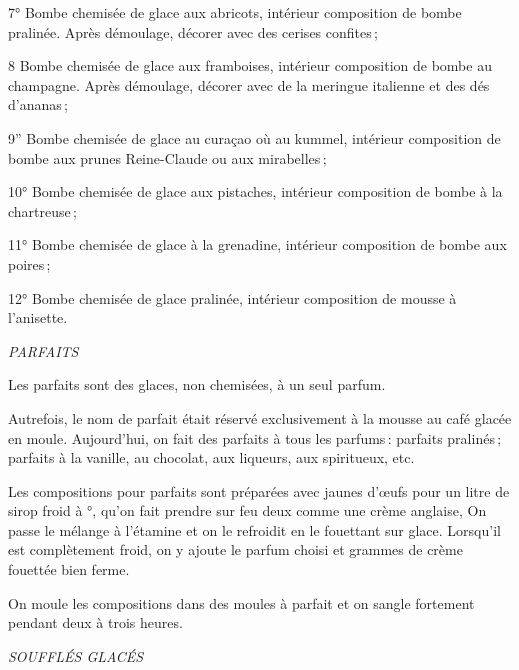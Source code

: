 7° Bombe chemisée de glace aux abricots, intérieur composition de bombe
pralinée. Après démoulage, décorer avec des cerises confites ;

8 Bombe chemisée de glace aux framboises, intérieur composition de bombe au
champagne. Après démoulage, décorer avec de la meringue italienne et des dés
d'ananas ;

9” Bombe chemisée de glace au curaçao où au kummel, intérieur composition
de bombe aux prunes Reine-Claude ou aux mirabelles ;

10° Bombe chemisée de glace aux pistaches, intérieur composition de bombe à
la chartreuse ;

11° Bombe chemisée de glace à la grenadine, intérieur composition de bombe
aux poires ;

12° Bombe chemisée de glace pralinée, intérieur composition de mousse à
l'anisette.


\bigskip

\begin{center}
\textit{PARFAITS}
\end{center}

\bigskip

Les parfaits sont des glaces, non chemisées, à un seul parfum.

Autrefois, le nom de parfait était réservé exclusivement à la mousse au café
glacée en moule. Aujourd'hui, on fait des parfaits à tous les parfums : parfaits
pralinés ; parfaits à la vanille, au chocolat, aux liqueurs, aux spiritueux, etc.

Les compositions pour parfaits sont préparées avec {\mmm} jaunes d'œufs
pour un litre de sirop froid à {\mmm}°, qu'on fait prendre sur feu deux
comme une crème anglaise, On passe le mélange à l'étamine et on le refroidit en
le fouettant sur glace. Lorsqu'il est complètement froid, on y ajoute le parfum
choisi et {\mmm} grammes de crème fouettée bien ferme.

On moule les compositions dans des moules à parfait et on sangle fortement
pendant deux à trois heures.

\bigskip

\begin{center}
\textit{SOUFFLÉS GLACÉS}
\end{center}


